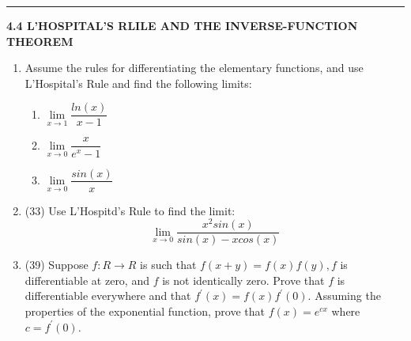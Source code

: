 \documentclass[fleqn]{article}
\begin{document}
  \rule{15cm}{1pt}

  \textbf{4.4 L'HOSPITAL'S RLILE AND THE INVERSE-FUNCTION THEOREM}
  \begin{enumerate}
    \item Assume the rules for differentiating the elementary functions, and use L'Hospital's Rule
    and find the following limits: 
    \begin{enumerate}
      \item $\lim\limits_{x \to 1} \dfrac{ln(x)}{x-1}$

      \item $\lim\limits_{x \to 0} \dfrac{x}{e^x-1}$

      \item $\lim\limits_{x \to 0} \dfrac{sin(x)}{x}$
    \end{enumerate}

    \item (33) Use L'Hospitd's Rule to find the limit:
    $$
      \lim\limits_{x \to 0} \dfrac{x^2 sin(x)}{sin(x)-x cos(x)}
    $$

    \item (39) Suppose $f: R \longrightarrow R$ is such that $f(x+y)=f(x)f(y), f$ is differentiable at zero, and $f$ is
    not identically zero. Prove that $f$ is differentiable everywhere and that $f^'(x)=f(x)f^'(0)$.
    Assuming the properties of the exponential function, prove that $f(x)=e^{cx}$ where $c=f^'(0)$.

  \end{enumerate}
\end{document}
